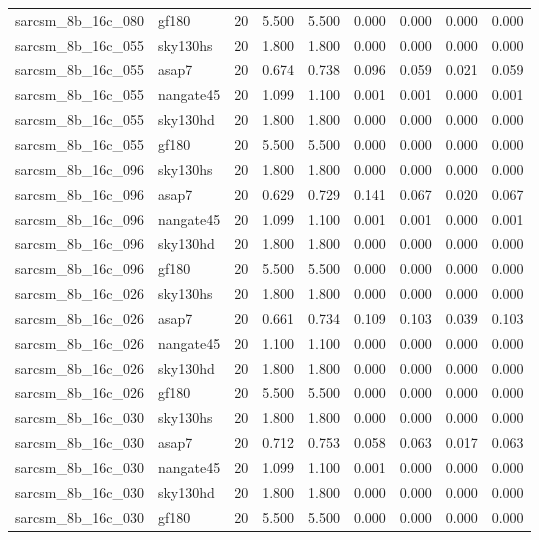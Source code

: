 \begin{tabular}{llrrrrrrr}
sarcsm\_8b\_16c\_080 & gf180 & 20 & 5.500 & 5.500 & 0.000 & 0.000 & 0.000 & 0.000 \\
sarcsm\_8b\_16c\_055 & sky130hs & 20 & 1.800 & 1.800 & 0.000 & 0.000 & 0.000 & 0.000 \\
sarcsm\_8b\_16c\_055 & asap7 & 20 & 0.674 & 0.738 & 0.096 & 0.059 & 0.021 & 0.059 \\
sarcsm\_8b\_16c\_055 & nangate45 & 20 & 1.099 & 1.100 & 0.001 & 0.001 & 0.000 & 0.001 \\
sarcsm\_8b\_16c\_055 & sky130hd & 20 & 1.800 & 1.800 & 0.000 & 0.000 & 0.000 & 0.000 \\
sarcsm\_8b\_16c\_055 & gf180 & 20 & 5.500 & 5.500 & 0.000 & 0.000 & 0.000 & 0.000 \\
sarcsm\_8b\_16c\_096 & sky130hs & 20 & 1.800 & 1.800 & 0.000 & 0.000 & 0.000 & 0.000 \\
sarcsm\_8b\_16c\_096 & asap7 & 20 & 0.629 & 0.729 & 0.141 & 0.067 & 0.020 & 0.067 \\
sarcsm\_8b\_16c\_096 & nangate45 & 20 & 1.099 & 1.100 & 0.001 & 0.001 & 0.000 & 0.001 \\
sarcsm\_8b\_16c\_096 & sky130hd & 20 & 1.800 & 1.800 & 0.000 & 0.000 & 0.000 & 0.000 \\
sarcsm\_8b\_16c\_096 & gf180 & 20 & 5.500 & 5.500 & 0.000 & 0.000 & 0.000 & 0.000 \\
sarcsm\_8b\_16c\_026 & sky130hs & 20 & 1.800 & 1.800 & 0.000 & 0.000 & 0.000 & 0.000 \\
sarcsm\_8b\_16c\_026 & asap7 & 20 & 0.661 & 0.734 & 0.109 & 0.103 & 0.039 & 0.103 \\
sarcsm\_8b\_16c\_026 & nangate45 & 20 & 1.100 & 1.100 & 0.000 & 0.000 & 0.000 & 0.000 \\
sarcsm\_8b\_16c\_026 & sky130hd & 20 & 1.800 & 1.800 & 0.000 & 0.000 & 0.000 & 0.000 \\
sarcsm\_8b\_16c\_026 & gf180 & 20 & 5.500 & 5.500 & 0.000 & 0.000 & 0.000 & 0.000 \\
sarcsm\_8b\_16c\_030 & sky130hs & 20 & 1.800 & 1.800 & 0.000 & 0.000 & 0.000 & 0.000 \\
sarcsm\_8b\_16c\_030 & asap7 & 20 & 0.712 & 0.753 & 0.058 & 0.063 & 0.017 & 0.063 \\
sarcsm\_8b\_16c\_030 & nangate45 & 20 & 1.099 & 1.100 & 0.001 & 0.000 & 0.000 & 0.000 \\
sarcsm\_8b\_16c\_030 & sky130hd & 20 & 1.800 & 1.800 & 0.000 & 0.000 & 0.000 & 0.000 \\
sarcsm\_8b\_16c\_030 & gf180 & 20 & 5.500 & 5.500 & 0.000 & 0.000 & 0.000 & 0.000 \\

\end{tabular}
